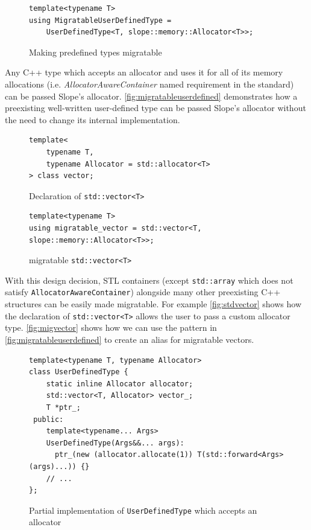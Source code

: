 \begin{figure}[t]
\begin{lstlisting}
template<typename T>
using MigratableUserDefinedType =
    UserDefinedType<T, slope::memory::Allocator<T>>;
\end{lstlisting}
\caption{
    Making predefined types migratable
}
\label{fig:migratableuserdefined}
\end{figure}

Any C++ type which accepts an allocator and uses it for all of its memory
allocations (i.e. \emph{AllocatorAwareContainer} \cite{cppnamedreqallocaware}
named requirement in the standard)
can be passed Slope's allocator. \autoref{fig:migratableuserdefined}
demonstrates how a preexisting well-written user-defined type can be
passed Slope's allocator without the need to change its internal implementation.

\begin{figure}[t]
\begin{lstlisting}
template<
    typename T,
    typename Allocator = std::allocator<T>
> class vector;
\end{lstlisting}
\caption{
    Declaration of \texttt{std::vector<T>}
}
\label{fig:stdvector}
\end{figure}


\begin{figure}[t]
\begin{lstlisting}
template<typename T>
using migratable_vector = std::vector<T, slope::memory::Allocator<T>>;

\end{lstlisting}
\caption{
    migratable \texttt{std::vector<T>}
}
\label{fig:migvector}
\end{figure}


With this design decision, STL containers (except \texttt{std::array} which
does not satisfy \texttt{AllocatorAwareContainer}) alongside many other preexisting
C++ structures can be easily made migratable.
For example \autoref{fig:stdvector} shows how the declaration of
\texttt{std::vector<T>}
allows the user to pass a custom allocator type. \autoref{fig:migvector} shows
how we can use the pattern in \autoref{fig:migratableuserdefined} to create
an alias for migratable vectors.



\begin{figure}[t]
\begin{lstlisting}
template<typename T, typename Allocator>
class UserDefinedType {
    static inline Allocator allocator;
    std::vector<T, Allocator> vector_;
    T *ptr_;
 public:
    template<typename... Args>
    UserDefinedType(Args&&... args):
      ptr_(new (allocator.allocate(1)) T(std::forward<Args>(args)...)) {}
    // ...
};
\end{lstlisting}
\caption{ Partial implementation of \texttt{UserDefinedType} which accepts an allocator}
\label{fig:userdefinedtype}
\end{figure}


